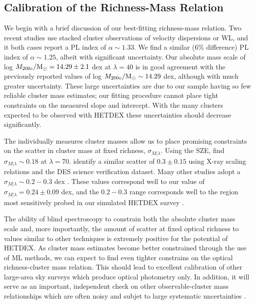 \subsection{Calibration of the Richness-Mass Relation}
We begin with a brief discussion of our best-fitting richness-mass relation. Two recent studies \citep{Farahi2016, Simet2016} use stacked cluster observations of velocity dispersions or WL, and it both cases report a PL index of $\alpha\sim1.33$. We find a similar (6\% difference) PL index of $\alpha\sim1.25$, albeit with significant uncertainty. Our absolute mass scale of log $M_{200c}/\hbox{$\mathrm{M}_\odot$} = 14.29\pm2.1$ dex at $\lambda=40$ is in good agreement with the previously reported values of log $M_{200c}/\hbox{$\mathrm{M}_\odot$} \sim 14.29$ dex, although with much greater uncertainty. These large uncertainties are due to our sample having so few reliable cluster mass estimates; our fitting procedure cannot place tight constraints on the measured slope and intercept. With the many clusters expected to be observed with HETDEX these uncertainties should decrease significantly.


The individually measures cluster masses allow us to place promising constraints on the scatter in cluster mass at fixed richness, $\sigma_{M|\lambda}$. Using the SZE, \cite{Saro2015} find $\sigma_{M|\lambda} \sim 0.18$ at $\lambda = 70$. \cite{Rykoff2016} identify a similar scatter of $0.3\pm0.15$ using X-ray scaling relations and the DES science verification dataset. Many other studies  adopt a $\sigma_{M|\lambda}\sim 0.2-0.3$ dex \citep{Rozo2014, Rozo2015}. These values correspond well to our value of $\sigma_{M|\lambda} = 0.24\pm0.09$ dex, and the $0.2-0.3$ range corresponds well to the region most sensitively probed in our simulated HETDEX survey .

The ability of blind spectroscopy to constrain both the absolute cluster mass scale and, more importantly, the amount of scatter at fixed optical richness to values similar to other techniques is extremely positive for the potential of HETDEX. As cluster mass estimates become better constrained through the use of ML methods, we can expect to find even tighter constrains on the optical richness-cluster mass relation. This should lead to excellent calibration of other large-area sky surveys which produce optical photometry only. In addition, it will serve as an important, independent check on other observable-cluster mass relationships which are often noisy and subjet to large systematic uncertainties .

